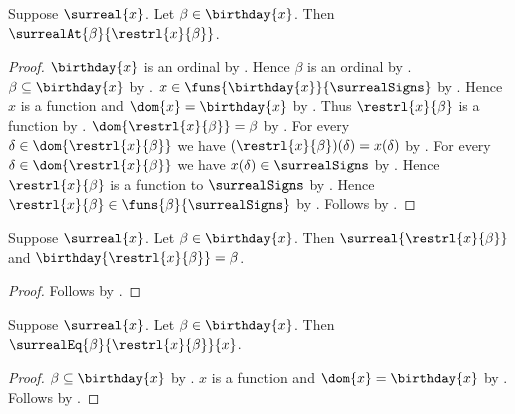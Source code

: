 \begin{proposition}\label{surreal_restriction_at}
    Suppose $\surreal{x}$.
    Let $\beta\in\birthday{x}$.
    Then $\surrealAt{\beta}{\restrl{x}{\beta}}$.
\end{proposition}
\begin{proof}
    $\birthday{x}$ is an ordinal
        by .
    Hence $\beta$ is an ordinal
        by .
    $\beta\subseteq\birthday{x}$
        by .
    $x\in\funs{\birthday{x}}{\surrealSigns}$
        by .
    Hence $x$ is a function and $\dom{x}=\birthday{x}$
        by .
    Thus $\restrl{x}{\beta}$ is a function
        by .
    $\dom{\restrl{x}{\beta}}=\beta$
        by .
    For every $\delta\in\dom{\restrl{x}{\beta}}$ we have
        $(\restrl{x}{\beta})(\delta)=x(\delta)$
        by .
    For every $\delta\in\dom{\restrl{x}{\beta}}$ we have
        $x(\delta)\in\surrealSigns$
        by .
    Hence $\restrl{x}{\beta}$ is a function to $\surrealSigns$
        by \auto.
    Hence $\restrl{x}{\beta}\in\funs{\beta}{\surrealSigns}$
        by .
    Follows by .
\end{proof}

\begin{proposition}\label{surreal_restriction_birthday}
    Suppose $\surreal{x}$.
    Let $\beta\in\birthday{x}$.
    Then $\surreal{\restrl{x}{\beta}}$ and
        $\birthday{\restrl{x}{\beta}}=\beta$.
\end{proposition}
\begin{proof}
    Follows by
        .
\end{proof}

\begin{proposition}\label{surreal_restriction_agrees}
    Suppose $\surreal{x}$.
    Let $\beta\in\birthday{x}$.
    Then $\surrealEq{\beta}{\restrl{x}{\beta}}{x}$.
\end{proposition}
\begin{proof}
    $\beta\subseteq\birthday{x}$
        by .
    $x$ is a function and $\dom{x}=\birthday{x}$
        by .
    Follows by
        .
\end{proof}

